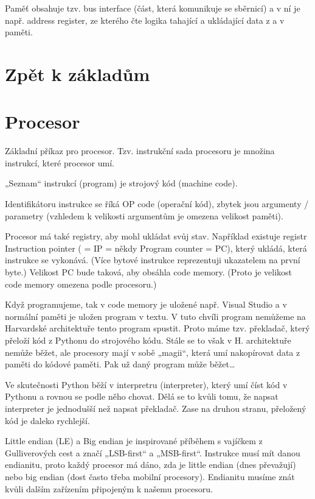 \documentclass[12pt]{article}					%
\begin{document}
        Paměť obsahuje tzv. bus interface (část, která komunikuje se sběrnicí) a v ní je např. address register, ze kterého čte logika tahající a ukládající data z a v paměti.


\section{Zpět k základům}
    \section{Procesor}
        \begin{definice}[Instrukce]
            Základní příkaz pro procesor. Tzv. instrukční sada procesoru je množina instrukcí, které procesor umí.

            „Seznam“ instrukcí (program) je strojový kód (machine code).

            Identifikátoru instrukce se říká OP code (operační kód), zbytek jsou argumenty / parametry (vzhledem k velikosti argumentům je omezena velikost paměti).
        \end{definice}

        \begin{definice}
            Procesor má také registry, aby mohl ukládat svůj stav. Například existuje registr Instruction pointer ( = IP = někdy Program counter = PC), který ukládá, která instrukce se vykonává. (Více bytové instrukce reprezentuji ukazatelem na první byte.) Velikost PC bude taková, aby obsáhla code memory. (Proto je velikost code memory omezena podle procesoru.)
        \end{definice}

        \begin{definice}[Programování]
            Když programujeme, tak v code memory je uložené např. Visual Studio a v normální paměti je uložen program v textu. V tuto chvíli program nemůžeme na Harvardské architektuře tento program spustit. Proto máme tzv. překladač, který přeloží kód z Pythonu do strojového kódu. Stále se to však v H. architektuře nemůže běžet, ale procesory mají v sobě „magii“, která umí nakopírovat data z paměti do kódové paměti. Pak už daný program může běžet…

            Ve skutečnosti Python běží v interpretru (interpreter), který umí číst kód v Pythonu a rovnou se podle něho chovat. Dělá se to kvůli tomu, že napsat interpreter je jednodušší než napsat překladač. Zase na druhou stranu, přeložený kód je daleko rychlejší.

            Little endian (LE) a Big endian je inspirované příběhem s vajíčkem z Gulliverových cest a značí „LSB-first“ a „MSB-first“. Instrukce musí mít danou endianitu, proto každý procesor má dáno, zda je little endian (dnes převažují) nebo big endian (dost často třeba mobilní procesory). Endianitu musíme znát kvůli dalším zařízením připojeným k našemu procesoru.
        \end{definice}
        
\end{document}
